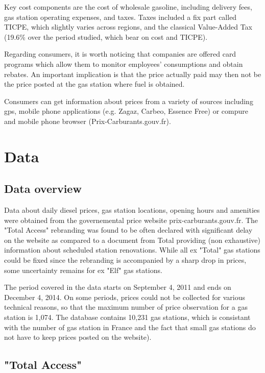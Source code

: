 \documentclass[11pt]{article}
\begin{document}
Key cost components are the cost of wholesale gasoline, including delivery fees,  gas station operating expenses, and taxes. Taxes included a fix part called TICPE, which slightly varies across regions, and the classical Value-Added Tax (19.6\% over the period studied, which bear on cost and TICPE).

Regarding consumers, it is worth noticing that companies are offered card programs which allow them to monitor employees' consumptions and obtain rebates. An important implication is that the price actually paid may then not be the price posted at the gas station where fuel is obtained.

Consumers can get information about prices from a variety of sources including gps, mobile phone applications (e.g. Zagaz, Carbeo, Essence Free) or compure and mobile phone browser (Prix-Carburants.gouv.fr).

\section{Data}

\subsection{Data overview}

Data about daily diesel prices, gas station locations, opening hours and amenities were obtained from the governemental price  website prix-carburants.gouv.fr. The "Total Access" rebranding was found to be often declared with significant delay on the website as compared to a document from Total providing (non exhaustive) information about scheduled station renovations. While all ex "Total" gas stations could be fixed since the rebranding is accompanied by a sharp drop in prices, some uncertainty remains for ex "Elf" gas stations.

The period covered in the data starts on September 4, 2011 and ends on December 4, 2014. On some periods, prices could not be collected for various technical reasons, so that the maximum number of price observation for a gas station is 1,074. The database contains 10,231 gas stations, which is consistant with the number of gas station in France and the fact that small gas stations do not have to keep prices posted on the website).

\subsection{"Total Access"}
\end{document}
